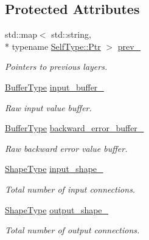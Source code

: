 \subsection*{Protected Attributes}
\begin{DoxyCompactItemize}
\item 
std\-::map$<$ std\-::string, \\*
typename \hyperlink{classffnn_1_1layer_1_1_layer_ac7c8ad3ab68dbb629077e9ace21871dc}{Self\-Type\-::\-Ptr} $>$ \hyperlink{classffnn_1_1layer_1_1_layer_ad9e644d000ce8595192153c6c49927b6}{prev\-\_\-}
\begin{DoxyCompactList}\small\item\em Pointers to previous layers. \end{DoxyCompactList}\item 
\hyperlink{classffnn_1_1layer_1_1_layer_ae755be4e0e146b543c0b46a9b8e0bb01}{Buffer\-Type} \hyperlink{classffnn_1_1layer_1_1_layer_ad4b5ac0708d6ada04d62df4fad377f1a}{input\-\_\-buffer\-\_\-}
\begin{DoxyCompactList}\small\item\em Raw input value buffer. \end{DoxyCompactList}\item 
\hyperlink{classffnn_1_1layer_1_1_layer_ae755be4e0e146b543c0b46a9b8e0bb01}{Buffer\-Type} \hyperlink{classffnn_1_1layer_1_1_layer_a79d676e9b8bd04d1a438266206d4b321}{backward\-\_\-error\-\_\-buffer\-\_\-}
\begin{DoxyCompactList}\small\item\em Raw backward error value buffer. \end{DoxyCompactList}\item 
\hyperlink{classffnn_1_1layer_1_1_layer_ae2f2d0063ab4b2c2a3a6ebf81f4ec32f}{Shape\-Type} \hyperlink{classffnn_1_1layer_1_1_layer_a07cc49b6890743a8045e3adc7c07aca5}{input\-\_\-shape\-\_\-}
\begin{DoxyCompactList}\small\item\em Total number of input connections. \end{DoxyCompactList}\item 
\hyperlink{classffnn_1_1layer_1_1_layer_ae2f2d0063ab4b2c2a3a6ebf81f4ec32f}{Shape\-Type} \hyperlink{classffnn_1_1layer_1_1_layer_a453330bda96277cd7b794bfab4804c47}{output\-\_\-shape\-\_\-}
\begin{DoxyCompactList}\small\item\em Total number of output connections. \end{DoxyCompactList}\item 

\end{DoxyCompactItemize}
